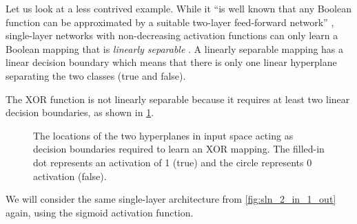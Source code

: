 \begin{example}
    \label{ex:unrealisable_xor}
    Let us look at a less contrived example.
    While it ``is well known that any Boolean function \elide can be approximated by a suitable two-layer feed-forward network'' \cite{blum1989}, 
    single-layer networks with non-decreasing activation functions can only learn a Boolean mapping that is \textit{linearly separable} \cite[723]{russell2010}.
    A linearly separable mapping has a linear decision boundary which means that there is only one linear hyperplane separating the two classes (true and false).
    
    The XOR function is not linearly separable because it requires at least two linear decision boundaries, as shown in \ref{fig:xor}.
    \begin{figure}
        \centering
        \caption{The locations of the two hyperplanes in input space acting as decision boundaries required to learn an XOR mapping. The filled-in dot represents an activation of 1 (true) and the circle represents 0 activation (false).}
        \label{fig:xor}
    \end{figure}
    We will consider the same single-layer architecture from \ref{fig:sln_2_in_1_out} again, using the sigmoid activation function.

\end{example}
